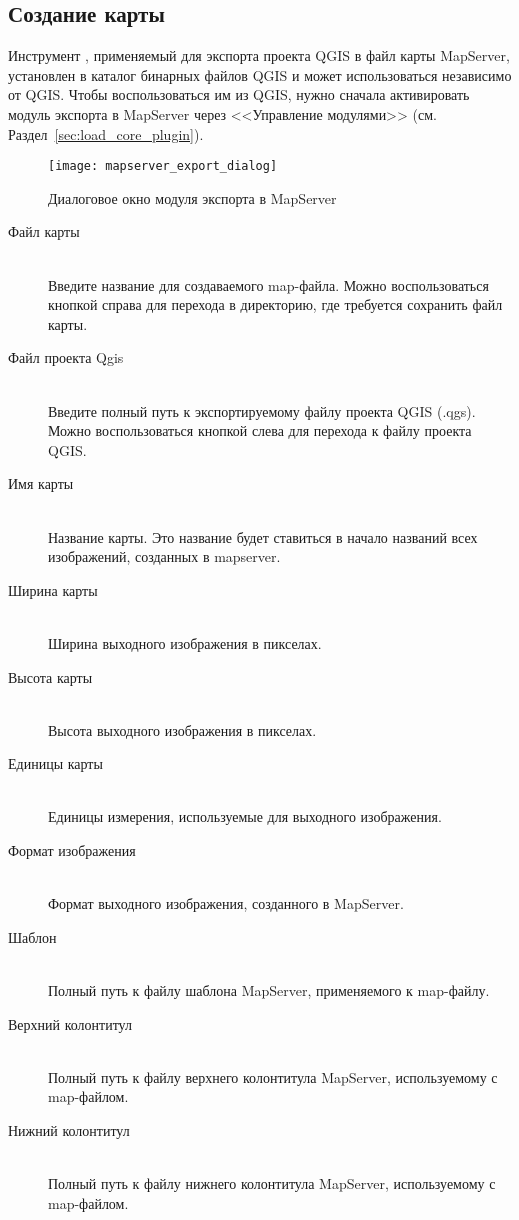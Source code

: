 \subsection{Создание карты}

Инструмент , применяемый для экспорта проекта QGIS
в файл карты MapServer, установлен в каталог бинарных файлов QGIS и
может использоваться независимо от QGIS. Чтобы воспользоваться им из
QGIS, нужно сначала активировать модуль экспорта в MapServer через
<<Управление модулями>> (см. Раздел~\ref{sec:load_core_plugin}).

\begin{figure}[ht]
\centering
  \texttt{[image: mapserver\_export\_dialog]}
  \caption{Диалоговое окно модуля экспорта в MapServer \wincaption}
  \label{fig:mapserver_export_dialog}
\end{figure}

\begin{description}
\item [Файл карты] \mbox{}\\
Введите название для создаваемого map-файла. Можно воспользоваться
кнопкой справа для перехода в директорию, где требуется сохранить файл
карты.
\item [Файл проекта Qgis] \mbox{}\\
Введите полный путь к экспортируемому файлу проекта QGIS (.qgs). Можно
воспользоваться кнопкой слева для перехода к файлу проекта QGIS.
\item [Имя карты] \mbox{}\\
Название карты. Это название будет ставиться в начало названий всех
изображений, созданных в mapserver.
\item [Ширина карты] \mbox{}\\
Ширина выходного изображения в пикселах.
\item [Высота карты] \mbox{}\\
Высота выходного изображения в пикселах.
\item [Единицы карты] \mbox{}\\
Единицы измерения, используемые для выходного изображения.
\item [Формат изображения] \mbox{}\\
Формат выходного изображения, созданного в MapServer.
\item [Шаблон] \mbox{}\\
Полный путь к файлу шаблона MapServer, применяемого к map-файлу.
\item [Верхний колонтитул] \mbox{}\\
Полный путь к файлу верхнего колонтитула MapServer, используемому с
map-файлом.
\item [Нижний колонтитул] \mbox{}\\
Полный путь к файлу нижнего колонтитула MapServer, используемому с
map-файлом.
\end{description}

